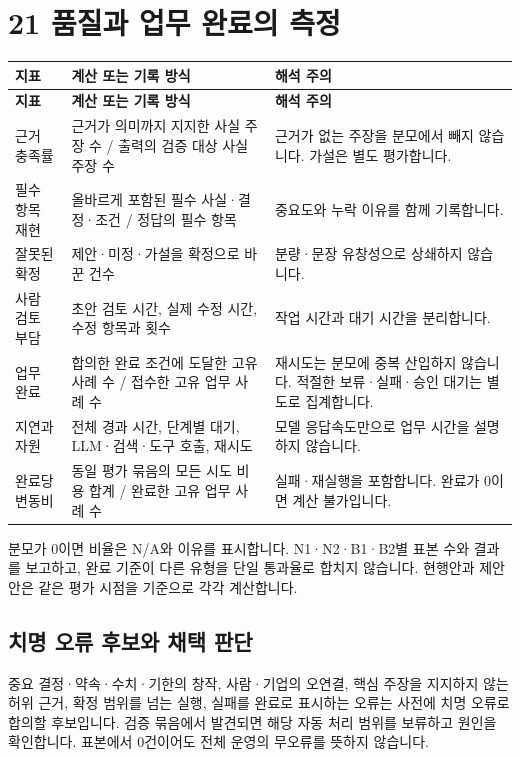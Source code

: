 \documentclass[a4paper,10pt]{article}
\newcommand{\Hline}{\noalign{\hrule height 1.5pt}}
\begin{document}
\clearpage
\section*{21 품질과 업무 완료의 측정}
{\fontsize{9.2}{13.616}\selectfont
\begin{longtable}{!{\vrule width 1.5pt}L{31.56mm}|L{66.28mm}|L{59.96mm}!{\vrule width 1.5pt}}
\Hline{} \textbf{지표} & \textbf{계산 또는 기록 방식} & \textbf{해석 주의}\\\hline\endfirsthead
\Hline{} \textbf{지표} & \textbf{계산 또는 기록 방식} & \textbf{해석 주의}\\\hline\endhead
\hline\endfoot\Hline\endlastfoot
근거 충족률 & 근거가 의미까지 지지한 사실 주장 수 / 출력의 검증 대상 사실 주장 수 & 근거가 없는 주장을 분모에서 빼지 않습니다. 가설은 별도 평가합니다.\\\hline
필수 항목 재현 & 올바르게 포함된 필수 사실·결정·조건 / 정답의 필수 항목 & 중요도와 누락 이유를 함께 기록합니다.\\\hline
잘못된 확정 & 제안·미정·가설을 확정으로 바꾼 건수 & 분량·문장 유창성으로 상쇄하지 않습니다.\\\hline
사람 검토 부담 & 초안 검토 시간, 실제 수정 시간, 수정 항목과 횟수 & 작업 시간과 대기 시간을 분리합니다.\\\hline
업무 완료 & 합의한 완료 조건에 도달한 고유 사례 수 / 접수한 고유 업무 사례 수 & 재시도는 분모에 중복 산입하지 않습니다. 적절한 보류·실패·승인 대기는 별도로 집계합니다.\\\hline
지연과 자원 & 전체 경과 시간, 단계별 대기, LLM·검색·도구 호출, 재시도 & 모델 응답속도만으로 업무 시간을 설명하지 않습니다.\\\hline
완료당 변동비 & 동일 평가 묶음의 모든 시도 비용 합계 / 완료한 고유 업무 사례 수 & 실패·재실행을 포함합니다. 완료가 0이면 계산 불가입니다.\\\hline
\end{longtable}}
분모가 0이면 비율은 N/A와 이유를 표시합니다. N1·N2·B1·B2별 표본 수와 결과를 보고하고, 완료 기준이 다른 유형을 단일 통과율로 합치지 않습니다. 현행안과 제안안은 같은 평가 시점을 기준으로 각각 계산합니다.


\subsection*{치명 오류 후보와 채택 판단}
중요 결정·약속·수치·기한의 창작, 사람·기업의 오연결, 핵심 주장을 지지하지 않는 허위 근거, 확정 범위를 넘는 실행, 실패를 완료로 표시하는 오류는 사전에 치명 오류로 합의할 후보입니다. 검증 묶음에서 발견되면 해당 자동 처리 범위를 보류하고 원인을 확인합니다. 표본에서 0건이어도 전체 운영의 무오류를 뜻하지 않습니다.
\end{document}
